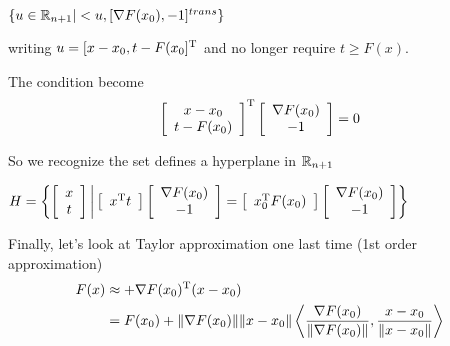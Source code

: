 $\{u\in\mathbb{R}_{n+1}|<u, [\nabla F(x_{0}) , -1]^{trans}\}$

writing $u=[x-x_{0}, t-F(x_{0}]^{{\rm T}}$ and no longer require $t\geq F(x)$.

The condition become
$$
\left[
\begin{array}{c} 
	x-x_{0}\\
	t-F(x_{0})
\end{array}
\right]^{{\rm T}}  
\left[
\begin{array}{c} 
\nabla F(x_{0})\\
-1
\end{array}
\right]
=
0
$$

So we recognize the set defines a hyperplane in $\mathbb{R}_{n+1}$

$H=\left\{\left[
\begin{array}{c} 
	x \\
    t
\end{array}
\right]  
\bigg|      
\left[
\begin{array}{c} 
x^{{\rm T}}t
\end{array}
\right]  
\left[
\begin{array}{c} 
\nabla F(x_{0}) \\
-1
\end{array}
\right]  
=
\left[
\begin{array}{c} 
x_{0}^{{\rm T}}F(x_{0})
\end{array}
\right]  
\left[
\begin{array}{c} 
	\nabla F(x_{0}) \\
	-1
\end{array}
\right]  
\right\}$

Finally, let's look at Taylor approximation one last time (1st order approximation)
\begin{align*}
F(x)&\approx + \nabla F(x_{0})^{{\rm T}}(x-x_{0})\\
&=F(x_{0})+\Vert\nabla F(x_{0})\Vert \Vert x-x_{0}\Vert \left< \frac{\nabla F(x_{0})}{\Vert\nabla F(x_{0})\Vert},\frac{x-x_{0}}{\Vert x-x_{0}\Vert}\right>
\end{align*}
























 








